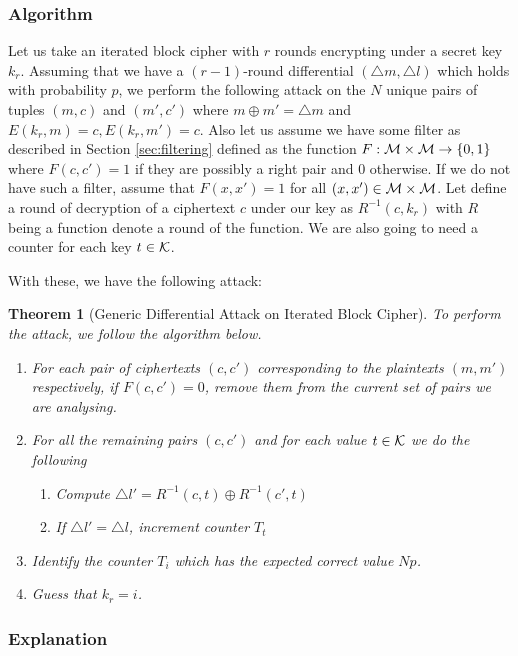\documentclass[12pt,a4paper]{article}
\newtheorem{theorem}{Theorem}
\begin{document}
\subsubsection{Algorithm}
\label{sec:algo}
Let us take an iterated block cipher with $r$ rounds encrypting under a secret
key $k_r$. Assuming that we have a $(r-1)$-round differential $(\triangle m, \triangle l)$
which holds with probability $p$, we perform the following attack on the $N$ unique pairs of tuples
$(m,c)$ and $(m',c')$ where $m \oplus m' = \triangle m$ and $E(k_r,m) = c,
E(k_r,m') = c$.  Also let us assume we have
some filter as described in Section \ref{sec:filtering} defined as the function
$F: {\cal{M} \times \cal{M}} \rightarrow \{0,1\}$ where $F(c,c') = 1$ if they are
possibly a right pair and 0 otherwise. If we do not have such a filter, assume
that $F(x,x') = 1$ for all $(x,x') \in \cal{M} \times \cal{M}$. Let  define a round of decryption of a ciphertext
$c$ under our key as $R^{-1}(c,k_r)$ with $R$ being a function denote a round
of the function. We are also going to need a counter for each key $t \in
\cal{K}$.

With these, we have the following attack:
\begin{theorem}[Generic Differential Attack on Iterated Block Cipher]
To perform the attack, we follow the algorithm below.
\begin{enumerate}
    \item For each pair of ciphertexts $(c,c')$ corresponding to the
    plaintexts $(m,m')$ respectively, if $F(c,c') = 0$, remove them from the
    current set of pairs we are analysing.
    \item For all the remaining pairs $(c,c')$ and for each value $t \in
    \cal{K}$ we do the following
        \begin{enumerate}
            \item Compute $\triangle l' = R^{-1}(c,t) \oplus R^{-1}(c',t)$
            \item If $\triangle l' = \triangle l$, increment counter $T_t$
        \end{enumerate}
    \item Identify the counter $T_i$ which has the expected correct value $N
    p$.
    \item Guess that $k_r = i$.
\end{enumerate}
\end{theorem}
\subsubsection{Explanation}
\end{document}
